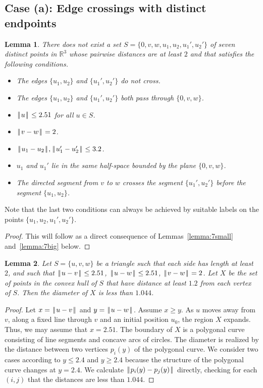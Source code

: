 \documentclass[11pt]{amsart}
\newcommand{\ring}[1]{\mathbb{#1}}
\def\|{{\hskip0.1em|\hskip-0.15em|\hskip0.1em}}
\newtheorem{lemma}{Lemma}
\begin{document}
\subsection{Case (a): Edge crossings with distinct endpoints}\label{sec:22}


\begin{lemma}\label{lemma:double-edge} 
There does not exist a set $S=\{0,v,w,u_1,u_2,u_1',u_2'\}$ of seven distinct points
in $\ring{R}^3$ whose pairwise distances are at least $2$ and that satisfies the following conditions.
\begin{itemize}
\item The edges $\{u_1,u_2\}$ and $\{u_1',u_2'\}$ do not cross.
\item The edges $\{u_1,u_2\}$ and $\{u_1',u_2'\}$ both pass through $\{0,v,w\}$.
\item $\|u\|\le 2.51$ for all $u\in S$.
\item $\|v-w\|=2$.
\item $\|u_1-u_2\|,\|u_1'-u_2'\|\le 3.2$.
\item $u_1$ and $u_1'$ lie in the same half-space bounded by the plane $\{0,v,w\}$.
\item The directed segment from $v$ to $w$ crosses the segment $\{u_1',u_2'\}$ before the segment $\{u_1,u_2\}$.
\end{itemize}
\end{lemma}

Note that the last two conditions can always 
be achieved by suitable labels on the points $\{u_1,u_2,u_1',u_2'\}$.

\begin{proof}
This will follow as a direct consequence of Lemmas~\ref{lemma:7small} and~\ref{lemma:7big} below.
\end{proof}

\begin{lemma}\label{lemma:diam} 
Let $S=\{u,v,w\}$ be a triangle such that each side has length at least $2$, and such that $\|u-v\|\le 2.51$, $\|u-w\|\le 2.51$, $\|v-w\|=2$.  Let $X$ be the set of points in the convex hull of $S$ that have distance at least $1.2$ from each vertex of $S$.  Then the diameter of $X$ is less than $1.044$.
\end{lemma}

\begin{proof} Let $x=\|u-v\|$ and $y=\|u-w\|$.  Assume $x\ge y$.  As $u$ moves away from $v$, along a fixed line through $v$ and an initial position $u_0$, the region $X$ expands.  Thus, we may assume that $x=2.51$.   The boundary of $X$ is a polygonal curve consisting of line segments and concave arcs of circles.  The diameter is realized by the distance between two vertices $p_i(y)$ of the polygonal curve. We consider two cases according to $y\le 2.4$ and $y\ge 2.4$ because the structure of the polygonal curve changes at $y=2.4$.  We calculate $\|p_i(y)-p_j(y)\|$ directly, checking for each $(i,j)$ that the distances are less than $1.044$.
\end{proof}
\end{document}
